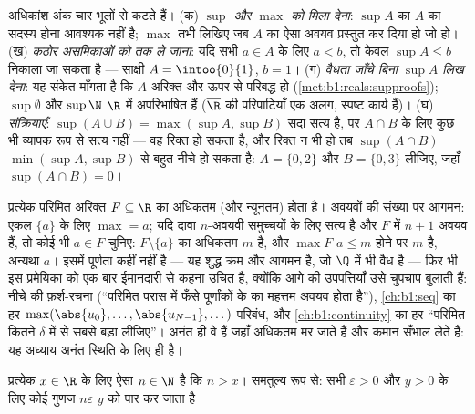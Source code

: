\begin{remark}
अधिकांश अंक चार भूलों से कटते हैं। (क) \emph{$\sup$ और $\max$ को मिला देना}:
$\sup A$ का $A$ का सदस्य होना आवश्यक नहीं है; $\max$ तभी लिखिए जब $A$ का ऐसा
अवयव प्रस्तुत कर दिया हो जो  हो। (ख) \emph{कठोर असमिकाओं को
 तक ले जाना}: यदि सभी $a \in A$ के लिए $a < b$, तो केवल $\sup A \leq
b$ निकाला जा सकता है --- साक्षी $A = \intoo{0}{1}$, $b = 1$। (ग) \emph{वैधता
जाँचे बिना $\sup A$ लिख देना}: यह संकेत माँगता है कि $A$ अरिक्त और ऊपर से
परिबद्ध हो (\cref{met:b1:reals:supproofs}); $\sup \emptyset$ और $\sup \N$
$\R$ में अपरिभाषित हैं ($\overline\R$ की परिपाटियाँ एक अलग, स्पष्ट कार्य
हैं)। (घ) \emph{ संक्रियाएँ}: $\sup(A \cup B) = \max(\sup A, \sup B)$
सदा सत्य है, पर $A \cap B$ के लिए कुछ भी व्यापक रूप से सत्य नहीं --- वह
रिक्त हो सकता है, और रिक्त न भी हो तब $\sup(A \cap B)$ $\min(\sup A, \sup
B)$ से बहुत नीचे हो सकता है: $A = \{0, 2\}$ और $B = \{0, 3\}$ लीजिए, जहाँ
$\sup(A \cap B) = 0$।
\end{remark}

\begin{example}[परिमित समुच्चयों के अधिकतम होते हैं --- एक मौन प्रयुक्त प्रमेयिका]\label{ex:b1:reals:finitemax}
प्रत्येक परिमित अरिक्त $F \subseteq \R$ का अधिकतम (और न्यूनतम) होता है।
अवयवों की संख्या पर आगमन: एकल  $\{a\}$ के लिए $\max = a$; यदि दावा
$n$-अवयवी समुच्चयों के लिए सत्य है और $F$ में $n + 1$ अवयव हैं, तो कोई भी $a
\in F$ चुनिए:  $F \setminus \{a\}$ का अधिकतम $m$ है, और $\max F$ $a
\leq m$ होने पर $m$ है, अन्यथा $a$। इसमें पूर्णता कहीं नहीं है --- यह शुद्ध
क्रम और आगमन है, जो $\Q$ में भी वैध है --- फिर भी इस प्रमेयिका को एक बार
ईमानदारी से कहना उचित है, क्योंकि आगे की उपपत्तियाँ उसे चुपचाप बुलाती हैं:
नीचे की फ़र्श-रचना (``परिमित परास में फँसे पूर्णांकों के  का महत्तम
अवयव होता है''), \cref{ch:b1:seq} का हर $\max(\abs{u_0}, \dots,
\abs{u_{N-1}}, \dots)$ परिबंध, और \cref{ch:b1:continuity} का हर ``परिमित
कितने $\delta$ में से सबसे बड़ा लीजिए''। अनंत  ही वे हैं जहाँ अधिकतम
मर जाते हैं और  कमान सँभाल लेते हैं: यह अध्याय अनंत स्थिति के लिए ही
है।
\end{example}

\begin{theorem}[आर्किमिडीज़ गुणधर्म]\label{thm:b1:reals:archimedes}
प्रत्येक $x \in \R$ के लिए ऐसा $n \in \N$ है कि $n > x$। समतुल्य रूप से: सभी
$\varepsilon > 0$ और $y > 0$ के लिए कोई गुणज $n\varepsilon$ $y$ को पार कर
जाता है।
\end{theorem}

